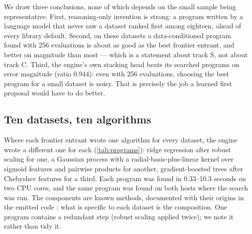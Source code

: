 We draw three conclusions, none of which depends on the small sample being representative. First,
reasoning-only invention is strong: a program written by a language model that never saw a dataset
ranked first among eighteen, ahead of every library default. Second, on these datasets a
data-conditioned program found with 256 evaluations is about as good as the best frontier entrant,
and better on magnitude than most --- which is a statement about track S, not about track C. Third,
the engine's own stacking head beats its searched programs on error magnitude (ratio 0.944): even
with 256 evaluations, choosing the best program for a small dataset is noisy. That is precisely the
job a learned first proposal would have to do better.

\subsection{Ten datasets, ten algorithms}
\label{sec:code}

Where each frontier entrant wrote one algorithm for every dataset, the engine wrote a different one
for each (\cref{tab:programs}): ridge regression after robust scaling for one, a Gaussian process
with a radial-basis-plus-linear kernel over sigmoid features and pairwise products for another,
gradient-boosted trees after Chebyshev features for a third. Each program was found in 0.33--10.3
seconds on two CPU cores, and the same program was found on both hosts where the search was run. The
components are known methods, documented with their origins in the emitted code \citep{hoerl1970ridge,friedman2001gbm};
what is specific to each dataset is the composition. One program contains a redundant step (robust
scaling applied twice); we note it rather than tidy it.

